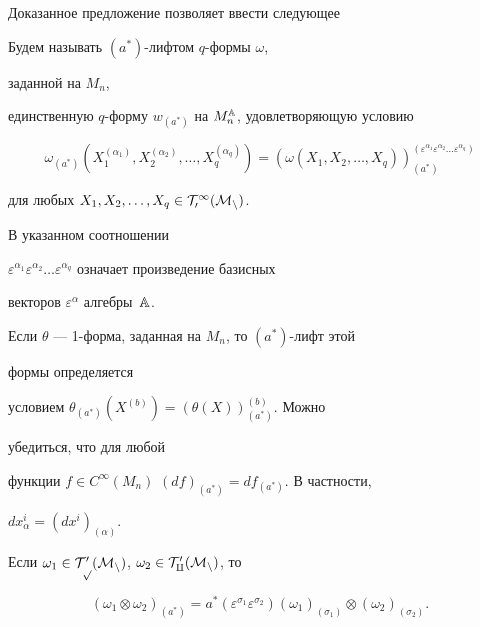  


Доказанное предложение позволяет ввести следующее 


 


\begin{defns} Будем называть $(a^*)$-лифтом $q$-формы $\omega$, 


заданной на $M_n$, 


единственную $q$-форму $w_{(a^*)}$ на $M^{\Bbb A}_n$, удовлетворяющую условию 


$$ 


\omega_{(a^*)}(X^{(\alpha_1)}_1,X^{(\alpha_2)}_2,\dotsc,


X^{(\alpha_q)}_q)=(\omega(X_1,X_2,\dotsc,X_q) 


)^{(\varepsilon^{\alpha_1}\varepsilon^{\alpha_2}\dotsc


\varepsilon^{\alpha_q})}_{(a^*)}


$$ 


для любых $X_1,X_2,\dotsc,X_q\in\cal T^1_0(M_n)$. 


\end{defns} 


 


В указанном соотношении 


$\varepsilon^{\alpha_1}\varepsilon^{\alpha_2}\dotsc


\varepsilon^{\alpha_q}$ означает произведение базисных 


векторов $\varepsilon^\alpha$ алгебры~$\Bbb A$. 


 


Если $\theta$ --- 1-форма, заданная на $M_n$, то $(a^*)$-лифт этой 


формы определяется 


условием $\theta_{(a^*)}(X^{(b)})=(\theta(X))^{(b)}_{(a^*)}$. Можно 


убедиться, что для любой 


функции $f\in C^\infty(M_n)$\; $(df)_{(a^*)}=df_{(a^*)}$. В частности, 


$dx^i_\alpha=(dx^i)_{(\alpha)}$. 


 


\begin{props} Если $\omega_1\in\cal T^0_p(M_n)$, $\omega_2\in\cal 


T^0_q(M_n)$, то 


$$ 


(\omega_1\otimes\omega_2)_{(a^*)}=a^*(\varepsilon^{\sigma_1} 


\varepsilon^{\sigma_2})(\omega_1)_{(\sigma_1)}\otimes 


(\omega_2)_{(\sigma_2)}. 


$$ 


\end{props} 


